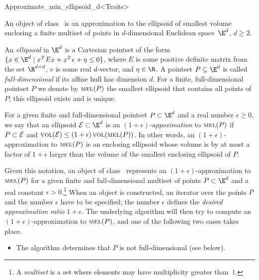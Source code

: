 \begin{ccRefClass}{Approximate_min_ellipsoid_d<Traits>}


\ccSaveThreeColumns

\ccDefinition

An object of class \ccRefName\ is an approximation to the
ellipsoid of smallest volume enclosing a finite multiset of points
in $d$-dimensional Euclidean space~$\E^d$, $d\ge 2$.

An \emph{ellipsoid} in $\E^d$ is a Cartesian pointset of the form $\{
x\in\E^d \mid x^T E x + x^T e + \eta\leq 0 \}$, where $E$ is some
positive definite matrix from the set $\R^{d\times d}$, $e$ is some
real $d$-vector, and $\eta\in\R$.  A pointset $P\subseteq \E^d$ is
called \emph{full-dimensional} if its affine hull has dimension $d$.
For a finite, full-dimensional pointset $P$ we denote by $\mathop{{\textsc{mel}}}\nolimits(P)$ the
smallest ellipsoid that contains all points of $P$; this ellipsoid
exists and is unique.


For a given finite and full-dimensional pointset $P\subset \E^d$ and a
real number $\epsilon\ge 0$, we say that an ellipsoid ${\cal
E}\subset\E^d$ is an \emph{$(1+\epsilon)$-appoximation} to $\mathop{{\textsc{mel}}}\nolimits(P)$ if
$P\subset {\cal E}$ and $\mathop{{\textsc{vol}}}\nolimits({\cal E}) \leq (1+\epsilon)
\mathop{{\textsc{vol}}}\nolimits(\mathop{{\textsc{mel}}}\nolimits(P))$.  In other words, an $(1+\epsilon)$-approximation to
$\mathop{{\textsc{mel}}}\nolimits(P)$ is an enclosing ellipsoid whose volume is by at most a
factor of $1+\epsilon$ larger than the volume of the smallest
enclosing ellipsoid of $P$.

Given this notation, an object of class \ccRefName\ represents an
$(1+\epsilon)$-approximation to $\mathop{{\textsc{mel}}}\nolimits(P)$ for a given finite and
full-dimensional multiset of points $P\subset\E^d$ and a real constant
$\epsilon>0$.\footnote{A \emph{multiset} is a set where elements may
have multiplicity greater than~$1$.} When an
 object is constructed, an
iterator over the points $P$ and the number $\epsilon$ have to be
specified; the number $\epsilon$ defines the \emph{desired
approximation ratio} $1+\epsilon$.  The underlying algorithm will then
try to compute an $(1+\epsilon)$-approximation to $\mathop{{\textsc{mel}}}\nolimits(P)$, and one of
the following two cases takes place.
\begin{itemize}
\item The algorithm determines that $P$ is not full-dimensional (see
   below).


\end{itemize}
\end{ccRefClass}

